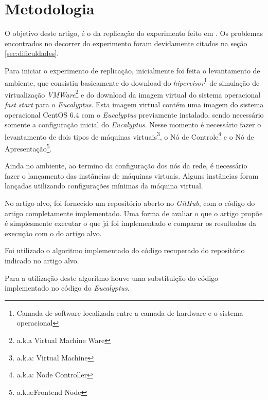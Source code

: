 \section{Metodologia}

O objetivo deste artigo, é o da replicação do experimento feito em \cite{elaine_et_al:14}. Os problemas encontrados no decorrer do experimento foram devidamente citados na seção \ref{sec:dificuldades}.

Para iniciar o experimento de replicação, inicialmente foi feita o levantamento de ambiente, que consistiu basicamente do download do \textit{hipervisor}\footnote{Camada de software localizada entre a camada de hardware e o sistema operacional\cite{dev_midia}} de simulação de virtualização \textit{VMWare}\footnote{a.k.a Virtual Machine Ware} e do download da imagem virtual do sistema operacional \textit{fast start} para o \textit{Eucalyptus}. Esta imagem virtual contém uma imagem do sistema operacional CentOS 6.4 com o \textit{Eucalyptus} previamente instalado, sendo necessário somente a configuração inicial do \textit{Eucalyptus}. Nesse momento é necessário fazer o levantamento de dois tipos de máquinas virtuais\footnote{a.k.a: Virtual Machine}, o Nó de Controle\footnote{a.k.a: Node Controller} e o Nó de Apresentação\footnote{a.k.a:Frontend Node}.

Ainda no ambiente, ao termino da configuração dos nós da rede, é necessário fazer o lançamento das instâncias de máquinas virtuais. Alguns instâncias foram lançadas utilizando configurações mínimas da máquina virtual.

No artigo alvo, foi fornecido um repositório aberto no \textit{GitHub}, com o código do artigo completamente implementado. Uma forma de avaliar o que o artigo propõe é simplesmente executar o que já foi implementado e comparar os resultados da execução com o do artigo alvo.

Foi utilizado o algoritmo implementado do código recuperado do repositório indicado no artigo alvo.

Para a utilização deste algoritmo houve uma substituição do código implementado no código do \textit{Eucalyptus}.
